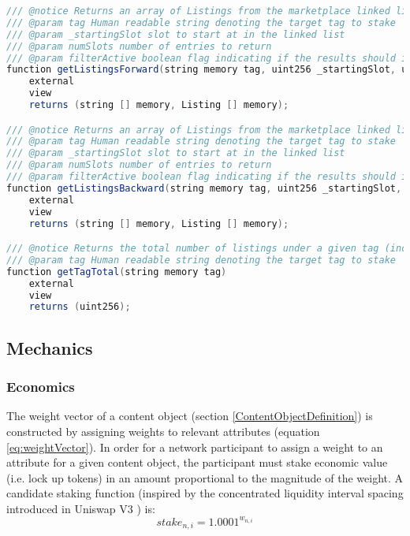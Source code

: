 \begin{lstlisting}[language=Java, caption=A minimal interface for reading and writing to the global ranking namespace.]
/// @notice Returns an array of Listings from the marketplace linked list from highest to lowest ranked
/// @param tag Human readable string denoting the target tag to stake
/// @param _startingSlot slot to start at in the linked list
/// @param numSlots number of entries to return
/// @param filterActive boolean flag indicating if the results should include expired listings (false) or not (true)
function getListingsForward(string memory tag, uint256 _startingSlot, uint256 numSlots, bool filterActive) 
    external 
    view 
    returns (string [] memory, Listing [] memory);

/// @notice Returns an array of Listings from the marketplace linked list from lowest to highest ranked
/// @param tag Human readable string denoting the target tag to stake
/// @param _startingSlot slot to start at in the linked list
/// @param numSlots number of entries to return
/// @param filterActive boolean flag indicating if the results should include expired listings (false) or not (true)
function getListingsBackward(string memory tag, uint256 _startingSlot, uint256 numSlots, bool filterActive);
    external 
    view 
    returns (string [] memory, Listing [] memory);

/// @notice Returns the total number of listings under a given tag (including expired listings which have not been removed)
/// @param tag Human readable string denoting the target tag to stake
function getTagTotal(string memory tag)
    external 
    view 
    returns (uint256);
\end{lstlisting}

\subsection{Mechanics}
\label{PrimitiveMechanics}

\subsubsection{Economics}
The weight vector of a content object (section \ref{ContentObjectDefinition}) is constructed by assigning weights to relevant attributes (equation \ref{eq:weightVector}). In order for a network participant to assign a weight to an attribute for a given content object, the participant must stake economic value (i.e. lock up tokens) in an amount proportional to the magnitude of the weight. A candidate staking function (inspired by the concentrated liquidity interval spacing introduced in Uniswap V3 \cite{adams2021uniswap}) is: 
\begin{equation}
\label{eq:stakefunction}
    stake_{n,i} = 1.0001^{w_{n,i}}
\end{equation}

